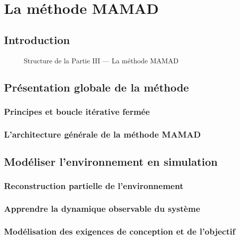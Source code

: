 \cleardoublepage
{}
\part{La méthode MAMAD}

\chapter*{Introduction}

\begin{figure}[h!]
    \centering
    \resizebox{\linewidth}{!}{%
        
    }
    \caption{Structure de la Partie III — La méthode MAMAD}
\end{figure}

\chapter{Présentation globale de la méthode}

\section{Principes et boucle itérative fermée}

\section{L'architecture générale de la méthode MAMAD}

\chapter{Modéliser l'environnement en simulation}
\section{Reconstruction partielle de l'environnement}
\section{Apprendre la dynamique observable du système}
\section{Modélisation des exigences de conception et de l'objectif}

